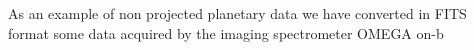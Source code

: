 As an example of non projected planetary data we have converted in FITS format some data
acquired by the imaging spectrometer OMEGA on-b